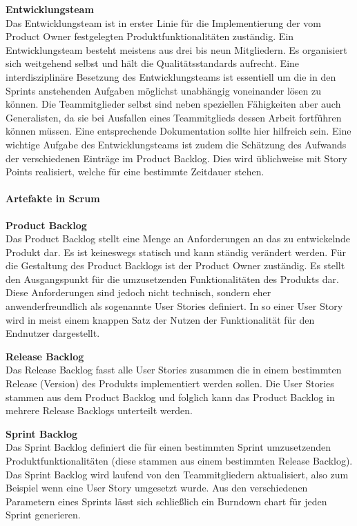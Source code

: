 \textbf{Entwicklungsteam}\\
Das Entwicklungsteam ist in erster Linie für die Implementierung der vom Product Owner festgelegten Produktfunktionalitäten zuständig. Ein Entwicklungsteam besteht meistens aus drei bis neun Mitgliedern. Es organisiert sich weitgehend selbst und hält die Qualitätsstandards aufrecht. Eine interdisziplinäre Besetzung des Entwicklungsteams ist essentiell um die in den Sprints anstehenden Aufgaben möglichst unabhängig voneinander lösen zu können. Die Teammitglieder selbst sind neben speziellen Fähigkeiten aber auch Generalisten, da sie bei Ausfallen eines Teammitglieds dessen Arbeit fortführen können müssen. Eine entsprechende Dokumentation sollte hier hilfreich sein. Eine wichtige Aufgabe des Entwicklungsteams ist zudem die Schätzung des Aufwands der verschiedenen Einträge im Product Backlog. Dies wird üblichweise mit Story Points realisiert, welche für eine bestimmte Zeitdauer stehen.

\paragraph{Artefakte in Scrum}
\textbf{Product Backlog}\\
Das Product Backlog stellt eine Menge an Anforderungen an das zu entwickelnde Produkt dar. Es ist keineswegs statisch und kann ständig verändert werden. Für die Gestaltung des Product Backlogs ist der Product Owner zuständig. Es stellt den Ausgangspunkt für die umzusetzenden Funktionalitäten des Produkts dar. Diese Anforderungen sind jedoch nicht technisch, sondern eher anwenderfreundlich als sogenannte User Stories definiert. In so einer User Story wird in meist einem knappen Satz der Nutzen der Funktionalität für den Endnutzer dargestellt.

\textbf{Release Backlog}\\
Das Release Backlog fasst alle User Stories zusammen die in einem bestimmten Release (Version) des Produkts implementiert werden sollen. Die User Stories stammen aus dem Product Backlog und folglich kann das Product Backlog in mehrere Release Backlogs unterteilt werden.

\textbf{Sprint Backlog}\\
Das Sprint Backlog definiert die für einen bestimmten Sprint umzusetzenden Produktfunktionalitäten (diese stammen aus einem bestimmten Release Backlog). Das Sprint Backlog wird laufend von den Teammitgliedern aktualisiert, also zum Beispiel wenn eine User Story umgesetzt wurde. Aus den verschiedenen Parametern eines Sprints lässt sich schließlich ein Burndown chart für jeden Sprint generieren.

